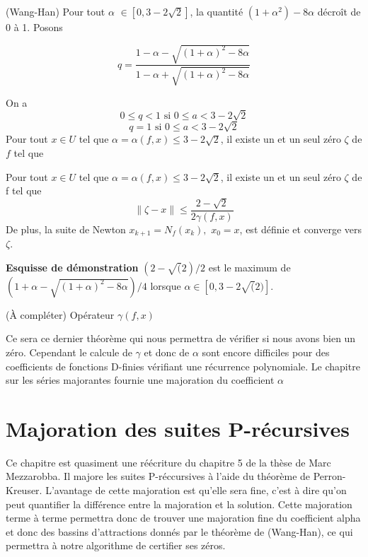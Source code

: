 \documentclass[a4paper,10.5pt]{article}
\begin{document}
	
	\begin{theorem} (Wang-Han)
		Pour tout $\alpha$ $\in [0,3-2\sqrt{2}]$, la quantité $(1+\alpha^{2})-8\alpha$ décroît de 0 à 1. Posons
		
		\[q=\frac{1-\alpha-\sqrt{(1+\alpha)^{2}-8\alpha}}{1-\alpha+\sqrt{(1+\alpha)^{2}-8\alpha}}\]
		
		On a
		\[0 \leq q<1 \text{ si } 0 \leq a < 3-2\sqrt{2}\]
		\[q=1        \text{ si } 0 \leq a < 3-2\sqrt{2}\]
		Pour tout $x\in U$ tel que $\alpha=\alpha(f,x) \leq 3-2\sqrt{2}$, il existe un et un seul zéro $\zeta$ de $f$ tel que\\
	\end{theorem}
	
	
	\begin{corollaire}
		Pour tout $x\in U$ tel que $\alpha=\alpha(f,x) \leq 3-2\sqrt{2}$, il existe un et un seul zéro $\zeta$ de f tel que
		\[\left\|\zeta-x\right\|\leq\frac{2-\sqrt{2}}{2\gamma(f,x)}\]
		De plus, la suite de Newton $x_{k+1}=N_{f}(x_{k}),$ $x_{0}=x$, est définie et converge vers $\zeta$.
	\end{corollaire}
	\noindent \textbf{Esquisse de démonstration} $(2-\sqrt(2)/2$ est le maximum de $(1+\alpha-\sqrt{(1+\alpha)^{2}-8\alpha})/4$ lorsque $\alpha \in [0,3-2\sqrt(2)]$.
	
	(À compléter)
	\noindent Opérateur $\gamma(f,x)$
	
	Ce sera ce dernier théorème qui nous permettra de vérifier si nous avons bien un zéro. Cependant le calcule de $\gamma$ et donc de $\alpha$ sont encore difficiles pour des coefficients de fonctions D-finies vérifiant une récurrence polynomiale. Le chapitre sur les séries majorantes fournie une majoration du coefficient $\alpha$
	
	
	
	
	\section{Majoration des suites P-récursives}
	
	Ce chapitre est quasiment une réécriture du chapitre 5 de la thèse de Marc Mezzarobba. Il majore les suites P-réccursives à l'aide du théorème de Perron-Kreuser.
	L'avantage de cette majoration est qu'elle sera fine, c'est à dire qu'on peut quantifier la différence entre la majoration et la solution.
	Cette majoration terme à terme permettra donc de trouver une majoration fine du coefficient alpha et donc des bassins d'attractions donnés par le théorème de (Wang-Han), ce qui permettra à notre algorithme de certifier ses zéros.
	
\end{document}
